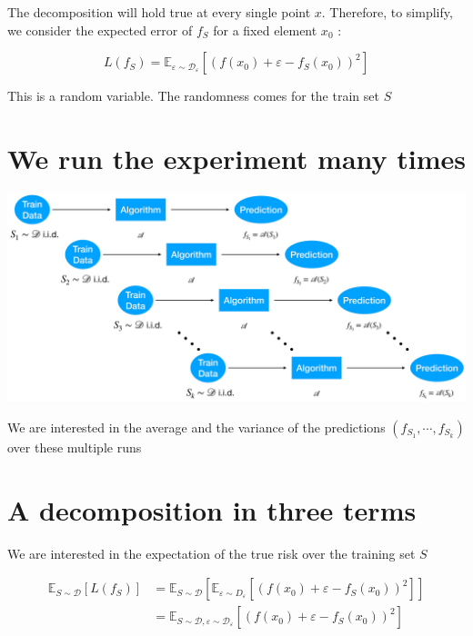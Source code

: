 \documentclass[10pt]{article}
\begin{document}
The decomposition will hold true at every single point $x$. Therefore, to simplify, we consider the expected error of $f_{S}$ for a fixed element $x_{0}$ :

$$
L\left(f_{S}\right)=\mathbb{E}_{\varepsilon \sim \mathscr{D}_{\varepsilon}}\left[\left(f\left(x_{0}\right)+\varepsilon-f_{S}\left(x_{0}\right)\right)^{2}\right]
$$

This is a random variable. The randomness comes for the train set $S$

\section*{We run the experiment many times}
\begin{center}
\includegraphics[max width=\textwidth]{2023_12_30_442f876157646883c2c9g-17}
\end{center}

We are interested in the average and the variance of the predictions $\left(f_{S_{1}}, \cdots, f_{S_{k}}\right)$ over these multiple runs

\section*{A decomposition in three terms}
We are interested in the expectation of the true risk over the training set $S$

$$
\begin{aligned}
\mathbb{E}_{S \sim \mathscr{D}}\left[L\left(f_{S}\right)\right] & =\mathbb{E}_{S \sim \mathscr{D}}\left[\mathbb{E}_{\varepsilon \sim D_{\varepsilon}}\left[\left(f\left(x_{0}\right)+\varepsilon-f_{S}\left(x_{0}\right)\right)^{2}\right]\right] \\
& =\mathbb{E}_{S \sim \mathscr{D}, \varepsilon \sim \mathscr{D}_{\varepsilon}}\left[\left(f\left(x_{0}\right)+\varepsilon-f_{S}\left(x_{0}\right)\right)^{2}\right]
\end{aligned}
$$
\end{document}
